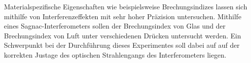 Materialspezifische Eigenschaften wie beispielsweise Brechungsindizes lassen
sich mithilfe von Interferenzeffekten mit sehr hoher Präzision untersuchen.
Mithilfe eines Sagnac-Interferometers sollen der Brechungsindex von Glas und
der Brechungsindex von Luft unter verschiedenen Drücken untersucht werden.
Ein Schwerpunkt bei der Durchführung dieses Experimentes soll dabei auf auf der
korrekten Justage des optischen Strahlengangs des Interferometers liegen.
